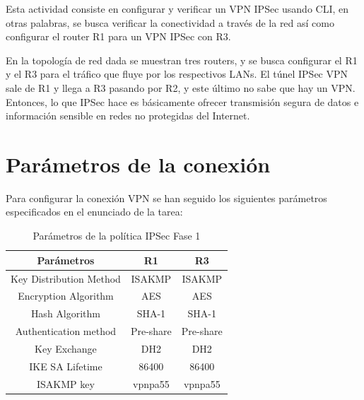\documentclass{article}
\begin{document}
    Esta actividad consiste en configurar y verificar un VPN IPSec usando CLI, en otras palabras, se busca verificar la conectividad a través de la red así como configurar el router R1 para un VPN IPSec con R3.
    
    En la topología de red dada se muestran tres routers, y se busca configurar el R1 y el R3 para el tráfico que fluye por los respectivos LANs. El túnel IPSec VPN sale de R1 y llega a R3 pasando por R2, y este último no sabe que hay un VPN. Entonces, lo que IPSec hace es básicamente ofrecer transmisión segura de datos e información sensible en redes no protegidas del Internet.

    \section{Parámetros de la conexión} \label{sec:params}

        Para configurar la conexión VPN se han seguido los siguientes parámetros especificados en el enunciado de la tarea:

        \begin{table}[!h]
            \centering
            \begin{tabular}{ ||c|c|c|| }
                \hline
                Parámetros & R1 & R3 \\ \hline
                Key Distribution Method & ISAKMP & ISAKMP \\ \hline
                Encryption Algorithm & AES & AES \\ \hline
                Hash Algorithm & SHA-1 & SHA-1 \\ \hline
                Authentication method & Pre-share & Pre-share \\ \hline
                Key Exchange & DH2 & DH2 \\ \hline
                IKE SA Lifetime & 86400 & 86400 \\ \hline
                ISAKMP key & vpnpa55 & vpnpa55 \\ \hline
            \end{tabular}
            \caption{Parámetros de la política IPSec Fase 1}
            \label{table:param1}
        \end{table}
\end{document}
